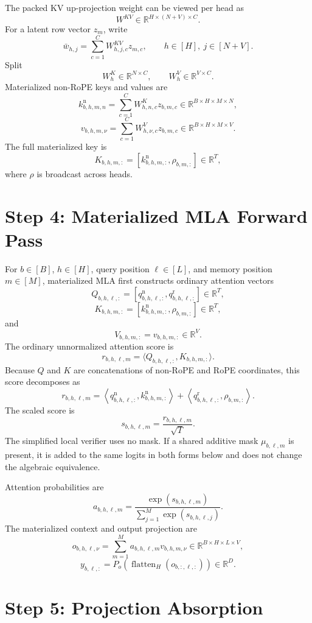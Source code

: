 \documentclass[11pt]{article}
\newcommand{\R}{\mathbb{R}}
\begin{document}
The packed KV up-projection weight can be viewed per head as
\[
  W^{KV}\in\R^{H\times(N+V)\times C}.
\]
For a latent row vector $z_m$, write
\[
  \bar w_{h,j}
  =
  \sum_{c=1}^C W^{KV}_{h,j,c}z_{m,c},
  \qquad
  h\in[H],\ j\in[N+V].
\]
Split
\[
  W^K_h\in\R^{N\times C},
  \qquad
  W^V_h\in\R^{V\times C}.
\]
Materialized non-RoPE keys and values are
\[
  k^{\mathrm n}_{b,h,m,n}
  =
  \sum_{c=1}^C W^K_{h,n,c}z_{b,m,c}
  \in\R^{B\times H\times M\times N},
\]
\[
  v_{b,h,m,\nu}
  =
  \sum_{c=1}^C W^V_{h,\nu,c}z_{b,m,c}
  \in\R^{B\times H\times M\times V}.
\]
The full materialized key is
\[
  K_{b,h,m,:}=[k^{\mathrm n}_{b,h,m,:},\rho_{b,m,:}]
  \in\R^T,
\]
where $\rho$ is broadcast across heads.

\section{Step 4: Materialized MLA Forward Pass}

For $b\in[B]$, $h\in[H]$, query position $\ell\in[L]$, and memory position
$m\in[M]$, materialized MLA first constructs ordinary attention vectors
\[
  Q_{b,h,\ell,:}
  =
  [q^{\mathrm n}_{b,h,\ell,:},q^{\mathrm r}_{b,h,\ell,:}]
  \in\R^T,
\]
\[
  K_{b,h,m,:}
  =
  [k^{\mathrm n}_{b,h,m,:},\rho_{b,m,:}]
  \in\R^T,
\]
and
\[
  V_{b,h,m,:}=v_{b,h,m,:}\in\R^V.
\]
The ordinary unnormalized attention score is
\[
  r_{b,h,\ell,m}
  =
  \langle Q_{b,h,\ell,:},K_{b,h,m,:}\rangle .
\]
Because $Q$ and $K$ are concatenations of non-RoPE and RoPE coordinates, this
score decomposes as
\[
  r_{b,h,\ell,m}
  =
  \left\langle q^{\mathrm n}_{b,h,\ell,:},k^{\mathrm n}_{b,h,m,:}\right\rangle
  +
  \left\langle q^{\mathrm r}_{b,h,\ell,:},\rho_{b,m,:}\right\rangle .
\]
The scaled score is
\[
  s_{b,h,\ell,m}=\frac{r_{b,h,\ell,m}}{\sqrt{T}}.
\]
The simplified local verifier uses no mask.  If a shared additive mask
$\mu_{b,\ell,m}$ is present, it is added to the same logits in both forms below
and does not change the algebraic equivalence.

Attention probabilities are
\[
  a_{b,h,\ell,m}
  =
  \frac{\exp(s_{b,h,\ell,m})}
       {\sum_{j=1}^M \exp(s_{b,h,\ell,j})}.
\]
The materialized context and output projection are
\[
  o_{b,h,\ell,\nu}
  =
  \sum_{m=1}^M a_{b,h,\ell,m}v_{b,h,m,\nu}
  \in\R^{B\times H\times L\times V},
\]
\[
  y_{b,\ell,:}
  =
  P_o\!\left(\operatorname{flatten}_H(o_{b,:, \ell,:})\right)
  \in\R^D.
\]

\section{Step 5: Projection Absorption}
\end{document}
